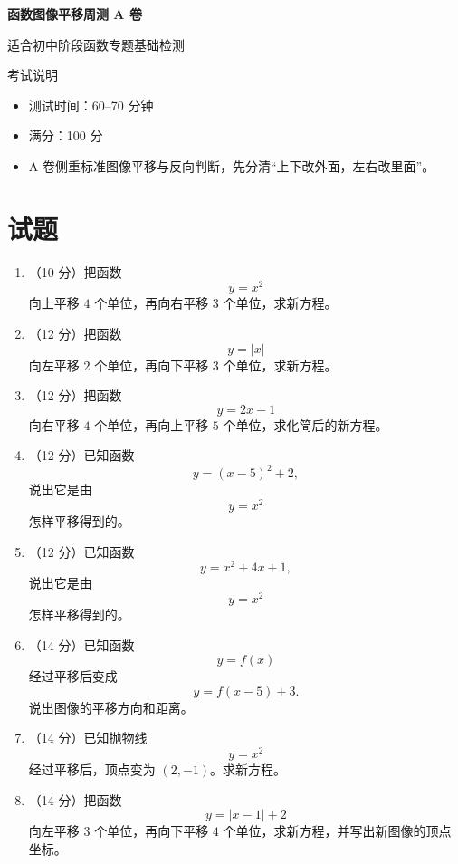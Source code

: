 \documentclass[11pt,a4paper,fontset=fandol]{ctexart}
\newcommand{\answerspace}{\vspace{2.3cm}}
\newcommand{\biganswerspace}{\vspace{3.1cm}}
\begin{document}
\thispagestyle{empty}
\begin{center}
{\fontsize{22}{28}\selectfont\bfseries 函数图像平移周测 A 卷\par}
\vspace{0.4cm}
{\large 适合初中阶段函数专题基础检测\par}
\end{center}

\begin{infobox}{考试说明}
\begin{itemize}
  \item 测试时间：60--70 分钟
  \item 满分：100 分
  \item A 卷侧重标准图像平移与反向判断，先分清“上下改外面，左右改里面”。
\end{itemize}
\end{infobox}

\section{试题}

\begin{enumerate}
  \item （10 分）把函数
  \[
  y=x^2
  \]
  向上平移 $4$ 个单位，再向右平移 $3$ 个单位，求新方程。
  \answerspace

  \item （12 分）把函数
  \[
  y=|x|
  \]
  向左平移 $2$ 个单位，再向下平移 $3$ 个单位，求新方程。
  \answerspace

  \item （12 分）把函数
  \[
  y=2x-1
  \]
  向右平移 $4$ 个单位，再向上平移 $5$ 个单位，求化简后的新方程。
  \answerspace

  \item （12 分）已知函数
  \[
  y=(x-5)^2+2,
  \]
  说出它是由
  \[
  y=x^2
  \]
  怎样平移得到的。
  \answerspace

  \item （12 分）已知函数
  \[
  y=x^2+4x+1,
  \]
  说出它是由
  \[
  y=x^2
  \]
  怎样平移得到的。
  \answerspace

  \item （14 分）已知函数
  \[
  y=f(x)
  \]
  经过平移后变成
  \[
  y=f(x-5)+3.
  \]
  说出图像的平移方向和距离。
  \biganswerspace

  \item （14 分）已知抛物线
  \[
  y=x^2
  \]
  经过平移后，顶点变为 $(2,-1)$。求新方程。
  \biganswerspace

  \item （14 分）把函数
  \[
  y=|x-1|+2
  \]
  向左平移 $3$ 个单位，再向下平移 $4$ 个单位，求新方程，并写出新图像的顶点坐标。
  \biganswerspace
\end{enumerate}
\end{document}
